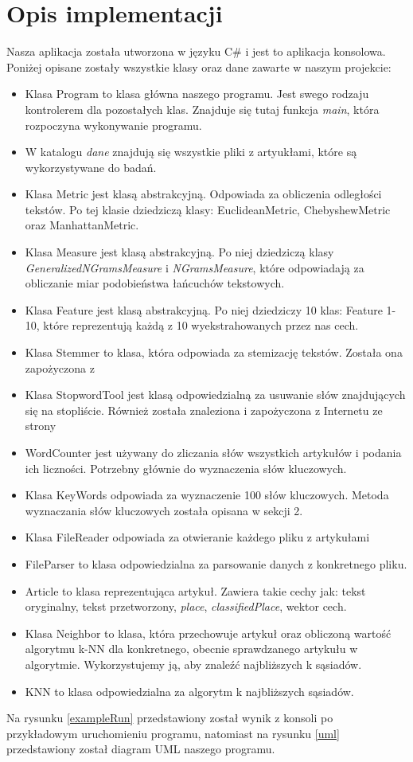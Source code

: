 \documentclass{classrep}
\begin{document}
\section{Opis implementacji} %
Nasza aplikacja została utworzona w języku C\# i jest to aplikacja konsolowa. Poniżej opisane zostały wszystkie klasy oraz dane zawarte w naszym projekcie:
\begin{itemize}
\item Klasa Program to klasa główna naszego programu. Jest swego rodzaju kontrolerem dla pozostałych klas. Znajduje się tutaj funkcja \textsl{main}, która rozpoczyna wykonywanie programu.
\item W katalogu \textsl{dane} znajdują się wszystkie pliki z artyukłami, które są wykorzystywane do badań.
\item Klasa Metric jest klasą abstrakcyjną. Odpowiada za obliczenia odległości tekstów. Po tej klasie dziedziczą klasy: EuclideanMetric, ChebyshewMetric oraz ManhattanMetric.
\item Klasa Measure jest klasą abstrakcyjną. Po niej dziedziczą klasy \textsl{GeneralizedNGramsMeasure} i \textsl{NGramsMeasure}, które odpowiadają za obliczanie miar podobieństwa łańcuchów tekstowych.
\item Klasa Feature jest klasą abstrakcyjną. Po niej dziedziczy 10 klas: Feature 1-10, które reprezentują każdą z 10 wyekstrahowanych przez nas cech.
\item Klasa Stemmer to klasa, która odpowiada za stemizację tekstów. Została ona zapożyczona z \cite{stemmer}
\item Klasa StopwordTool jest klasą odpowiedzialną za usuwanie słów znajdujących się na stopliście. Również została znaleziona i zapożyczona z Internetu ze strony \cite{stopword}
\item WordCounter jest używany do zliczania słów wszystkich artykułów i podania ich liczności. Potrzebny głównie do  wyznaczenia słów kluczowych.
\item Klasa KeyWords odpowiada za wyznaczenie 100 słów kluczowych. Metoda wyznaczania słów kluczowych została opisana w sekcji 2.
\item Klasa FileReader odpowiada za otwieranie każdego pliku z artykułami
\item FileParser to klasa odpowiedzialna za parsowanie danych z konkretnego pliku.
\item Article to klasa reprezentująca artykuł. Zawiera takie cechy jak: tekst oryginalny, tekst przetworzony, \textsl{place}, \textsl{classifiedPlace}, wektor cech.
\item Klasa Neighbor to klasa, która przechowuje artykuł oraz obliczoną wartość algorytmu k-NN dla konkretnego, obecnie sprawdzanego artykułu w algorytmie. Wykorzystujemy ją, aby znaleźć najbliższych k sąsiadów.
\item KNN to klasa odpowiedzialna za algorytm k najbliższych sąsiadów. 
\end{itemize}
Na rysunku \ref{exampleRun} przedstawiony został wynik z konsoli po przykładowym uruchomieniu programu, natomiast na rysunku \ref{uml} przedstawiony został diagram UML naszego programu. 
\end{document}
